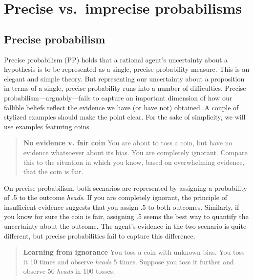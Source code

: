 \documentclass[
  10pt,
  dvipsnames,enabledeprecatedfontcommands]{scrartcl}
\begin{document}

\hypertarget{precise-vs.-imprecise-probabilisms}{%
\section{Precise vs.~imprecise
probabilisms}\label{precise-vs.-imprecise-probabilisms}}

\label{sec:three-probabilism}

\hypertarget{precise-probabilism}{%
\subsection{Precise probabilism}\label{precise-probabilism}}

Precise probabilism (\textsf{PP}) holds that a rational agent's
uncertainty about a hypothesis is to be represented as a single, precise
probability measure. This is an elegant and simple theory. But
representing our uncertainty about a proposition in terms of a single,
precise probability runs into a number of difficulties. Precise
probabilism---arguably---fails to capture an important dimension of how
our fallible beliefs reflect the evidence we have (or have not)
obtained. A couple of stylized examples should make the point clear. For
the sake of simplicity, we will use examples featuring coins.

\begin{quote}
\textbf{No evidence v. fair coin}
You are about to toss a coin, but have no evidence 
whatsoever about its bias. You are completely ignorant. 
Compare this to the situation in which you know, 
based on overwhelming evidence, that the coin is fair. 
\end{quote}

\noindent On precise probabilism, both scenarios are represented by
assigning a probability of .5 to the outcome \emph{heads}. If you are
completely ignorant, the principle of insufficient evidence suggests
that you assign .5 to both outcomes. Similarly, if you know for sure the
coin is fair, assigning .5 seems the best way to quantify the
uncertainty about the outcome. The agent's evidence in the two scenario
is quite different, but precise probabilities fail to capture this
difference.

\begin{quote}
\textbf{Learning from ignorance}
You toss a coin with unknown bias. You toss it 10 times and observe \emph{heads} 5 times. Suppose you toss it further and observe 50 \emph{heads} in 100 tosses. 
\end{quote}
\end{document}
